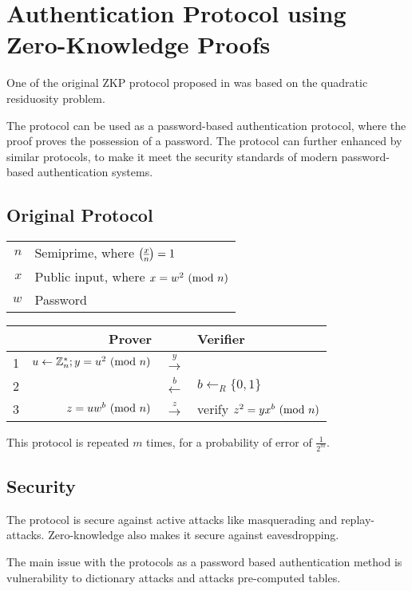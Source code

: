 \section{Authentication Protocol using Zero-Knowledge Proofs}

One of the original ZKP protocol proposed in \cite{GMR} was based on the quadratic residuosity problem.

The protocol can be used as a password-based authentication protocol, where the proof proves the possession of a password.
The protocol can further enhanced by similar protocols, to make it meet the security standards of modern password-based authentication systems.

\subsection{Original Protocol} %
\bigskip
\begin{center}
	\begin{tabular}{rl}
		$n$ & Semiprime, where $\legendre{x}{n} = 1$\\
 		$x$ & Public input, where $x = w^2 \ (\mathrm{mod}\ n)$\\
 		$w$ & Password\\
	\end{tabular}
\end{center}
\bigskip
\begin{center}
	\begin{tabular}{rr|c|l}
		& Prover && Verifier\\
		\hline
		1 & $u \leftarrow \Bbb{Z}_{n}^{*}; y = u^2 \ (\mathrm{mod}\ n)$ & $\xrightarrow{y}$\\
		2 & & $\xleftarrow{b}$ & $b \leftarrow_R \{0, 1\} $\\
		3 & $z = uw^b\ (\mathrm{mod}\ n)$ & $\xrightarrow z$ & verify $z^2 = yx^b \ (\mathrm{mod}\ n)$\\
	\end{tabular}
\end{center}
This protocol is repeated $m$ times, for a probability of error of $\frac{1}{2^m}$.
\subsection{Security}
The protocol is secure against active attacks like masquerading and replay-attacks. 
Zero-knowledge also makes it secure against eavesdropping.

The main issue with the protocols as a password based authentication method is vulnerability to dictionary attacks and attacks pre-computed tables.

